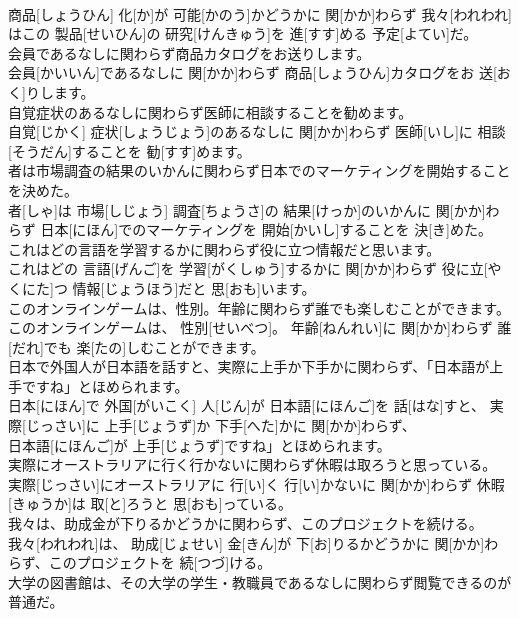 \documentclass[8pt]{extreport}
\begin{document}
\begin{CJK}{UTF8}{min}
\\	商品[しょうひん] 化[か]が 可能[かのう]かどうかに 関[かか]わらず 我々[われわれ]はこの 製品[せいひん]の 研究[けんきゅう]を 進[すす]める 予定[よてい]だ。
\\	会員であるなしに関わらず商品カタログをお送りします。	
\\	会員[かいいん]であるなしに 関[かか]わらず 商品[しょうひん]カタログをお 送[おく]りします。
\\	自覚症状のあるなしに関わらず医師に相談することを勧めます。	
\\	自覚[じかく] 症状[しょうじょう]のあるなしに 関[かか]わらず 医師[いし]に 相談[そうだん]することを 勧[すす]めます。
\\	者は市場調査の結果のいかんに関わらず日本でのマーケティングを開始することを決めた。	
\\	者[しゃ]は 市場[しじょう] 調査[ちょうさ]の 結果[けっか]のいかんに 関[かか]わらず 日本[にほん]でのマーケティングを 開始[かいし]することを 決[き]めた。
\\	これはどの言語を学習するかに関わらず役に立つ情報だと思います。	
\\	これはどの 言語[げんご]を 学習[がくしゅう]するかに 関[かか]わらず 役に立[やくにた]つ 情報[じょうほう]だと 思[おも]います。
\\	このオンラインゲームは、性別。年齢に関わらず誰でも楽しむことができます。	
\\	このオンラインゲームは、 性別[せいべつ]。 年齢[ねんれい]に 関[かか]わらず 誰[だれ]でも 楽[たの]しむことができます。
\\	日本で外国人が日本語を話すと、実際に上手か下手かに関わらず、「日本語が上手ですね」とほめられます。	
\\	日本[にほん]で 外国[がいこく] 人[じん]が 日本語[にほんご]を 話[はな]すと、 実際[じっさい]に 上手[じょうず]か 下手[へた]かに 関[かか]わらず、
\\	日本語[にほんご]が 上手[じょうず]ですね」とほめられます。
\\	実際にオーストラリアに行く行かないに関わらず休暇は取ろうと思っている。	
\\	実際[じっさい]にオーストラリアに 行[い]く 行[い]かないに 関[かか]わらず 休暇[きゅうか]は 取[と]ろうと 思[おも]っている。
\\	我々は、助成金が下りるかどうかに関わらず、このプロジェクトを続ける。	
\\	我々[われわれ]は、 助成[じょせい] 金[きん]が 下[お]りるかどうかに 関[かか]わらず、このプロジェクトを 続[つづ]ける。
\\	大学の図書館は、その大学の学生・教職員であるなしに関わらず閲覧できるのが普通だ。	

\end{CJK}
\end{document}
